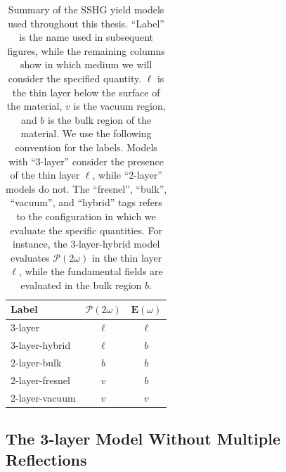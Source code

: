 \begin{table}[b]
\centering
\begin{tabular}{| l | c | c |}
\hline 
Label         &  $\boldsymbol{\mathcal{P}}(2\omega)$  &  $\mathbf{E}(\omega)$ \\
\hline 
3-layer         &          $\ell$           &      $\ell$   \\
3-layer-hybrid  &          $\ell$           &        $b$    \\
2-layer-bulk    &            $b$            &        $b$    \\
2-layer-fresnel &            $v$            &        $b$    \\
2-layer-vacuum  &            $v$            &        $v$    \\
\hline 
\end{tabular}
\caption[SSHG yield models explored in this thesis.]
{Summary of the SSHG yield models used throughout this thesis. ``Label'' is the
name used in subsequent figures, while the remaining columns show in which
medium we will consider the specified quantity. $\ell$ is the thin layer below
the surface of the material, $v$ is the vacuum region, and $b$ is the bulk
region of the material. We use the following convention for the labels. Models
with ``3-layer'' consider the presence of the thin layer $\ell$, while
``2-layer'' models do not. The ``fresnel'', ``bulk'', ``vacuum'', and ``hybrid''
tags refers to the configuration in which we evaluate the specific quantities.
For instance, the 3-layer-hybrid model evaluates
$\boldsymbol{\mathcal{P}}(2\omega)$ in the thin layer $\ell$, while the
fundamental fields are evaluated in the bulk region $b$.}
\label{tab:models}
\end{table}



\subsection{The 3-layer Model Without Multiple Reflections}\label{sec:nomr}

